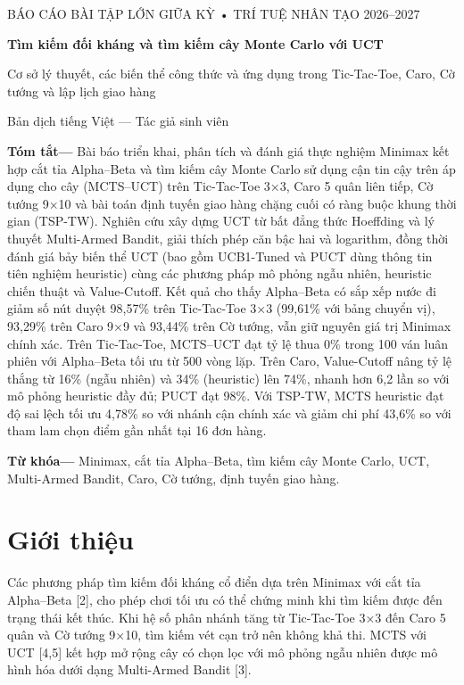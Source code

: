 \documentclass[11pt,a4paper]{article}
\begin{document}
\begin{center}
{\small\sffamily BÁO CÁO BÀI TẬP LỚN GIỮA KỲ • TRÍ TUỆ NHÂN TẠO 2026–2027}\par\medskip
{\LARGE\bfseries Tìm kiếm đối kháng và tìm kiếm cây Monte Carlo với UCT}\par\medskip
{\large Cơ sở lý thuyết, các biến thể công thức và ứng dụng trong Tic-Tac-Toe, Caro, Cờ tướng và lập lịch giao hàng}\par\medskip
{\small Bản dịch tiếng Việt — Tác giả sinh viên}
\end{center}
\noindent\textbf{Tóm tắt—} Bài báo triển khai, phân tích và đánh giá thực nghiệm Minimax kết hợp cắt tỉa Alpha–Beta và tìm kiếm cây Monte Carlo sử dụng cận tin cậy trên áp dụng cho cây (MCTS–UCT) trên Tic-Tac-Toe 3×3, Caro 5 quân liên tiếp, Cờ tướng 9×10 và bài toán định tuyến giao hàng chặng cuối có ràng buộc khung thời gian (TSP-TW). Nghiên cứu xây dựng UCT từ bất đẳng thức Hoeffding và lý thuyết Multi-Armed Bandit, giải thích phép căn bậc hai và logarithm, đồng thời đánh giá bảy biến thể UCT (bao gồm UCB1-Tuned và PUCT dùng thông tin tiên nghiệm heuristic) cùng các phương pháp mô phỏng ngẫu nhiên, heuristic chiến thuật và Value-Cutoff. Kết quả cho thấy Alpha–Beta có sắp xếp nước đi giảm số nút duyệt 98,57\% trên Tic-Tac-Toe 3×3 (99,61\% với bảng chuyển vị), 93,29\% trên Caro 9×9 và 93,44\% trên Cờ tướng, vẫn giữ nguyên giá trị Minimax chính xác. Trên Tic-Tac-Toe, MCTS–UCT đạt tỷ lệ thua 0\% trong 100 ván luân phiên với Alpha–Beta tối ưu từ 500 vòng lặp. Trên Caro, Value-Cutoff nâng tỷ lệ thắng từ 16\% (ngẫu nhiên) và 34\% (heuristic) lên 74\%, nhanh hơn 6,2 lần so với mô phỏng heuristic đầy đủ; PUCT đạt 98\%. Với TSP-TW, MCTS heuristic đạt độ sai lệch tối ưu 4,78\% so với nhánh cận chính xác và giảm chi phí 43,6\% so với tham lam chọn điểm gần nhất tại 16 đơn hàng.

\noindent\textbf{Từ khóa—} Minimax, cắt tỉa Alpha–Beta, tìm kiếm cây Monte Carlo, UCT, Multi-Armed Bandit, Caro, Cờ tướng, định tuyến giao hàng.
\section{Giới thiệu}
Các phương pháp tìm kiếm đối kháng cổ điển dựa trên Minimax với cắt tỉa Alpha–Beta [2], cho phép chơi tối ưu có thể chứng minh khi tìm kiếm được đến trạng thái kết thúc. Khi hệ số phân nhánh tăng từ Tic-Tac-Toe 3×3 đến Caro 5 quân và Cờ tướng 9×10, tìm kiếm vét cạn trở nên không khả thi. MCTS với UCT [4,5] kết hợp mở rộng cây có chọn lọc với mô phỏng ngẫu nhiên được mô hình hóa dưới dạng Multi-Armed Bandit [3].
\end{document}
